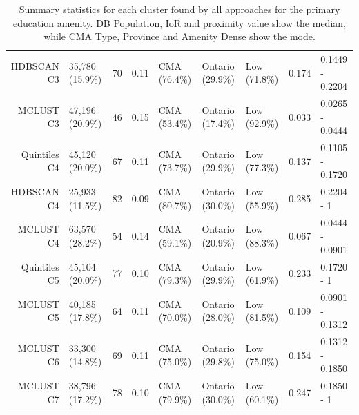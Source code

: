 \documentclass[11pt, a4paper]{article}
\begin{document}
\begin{table}[H]
{\begin{tabular}{|r|llllllll|}
  HDBSCAN C3 & 35,780 (15.9\%) & 70 & 0.11 & CMA (76.4\%) & Ontario (29.9\%) & Low (71.8\%) & 0.174 & 0.1449 - 0.2204 \\ 
  MCLUST C3 & 47,196 (20.9\%) & 46 & 0.15 & CMA (53.4\%) & Ontario (17.4\%) & Low (92.9\%) & 0.033 & 0.0265 - 0.0444 \\ 
  Quintiles C4 & 45,120 (20.0\%) & 67 & 0.11 & CMA (73.7\%) & Ontario (29.9\%) & Low (77.3\%) & 0.137 & 0.1105 - 0.1720 \\ 
  HDBSCAN C4 & 25,933 (11.5\%) & 82 & 0.09 & CMA (80.7\%) & Ontario (30.0\%) & Low (55.9\%) & 0.285 & 0.2204 - 1 \\ 
  MCLUST C4 & 63,570 (28.2\%) & 54 & 0.14 & CMA (59.1\%) & Ontario (20.9\%) & Low (88.3\%) & 0.067 & 0.0444 - 0.0901 \\ 
  Quintiles C5 & 45,104 (20.0\%) & 77 & 0.10 & CMA (79.3\%) & Ontario (29.9\%) & Low (61.9\%) & 0.233 & 0.1720 - 1 \\ 
  MCLUST C5 & 40,185 (17.8\%) & 64 & 0.11 & CMA (70.0\%) & Ontario (28.0\%) & Low (81.5\%) & 0.109 & 0.0901 - 0.1312 \\ 
  MCLUST C6 & 33,300 (14.8\%) & 69 & 0.11 & CMA (75.0\%) & Ontario (29.8\%) & Low (75.0\%) & 0.154 & 0.1312 - 0.1850 \\ 
  MCLUST C7 & 38,796 (17.2\%) & 78 & 0.10 & CMA (79.9\%) & Ontario (30.0\%) & Low (60.1\%) & 0.247 & 0.1850 - 1 \\ 
   \hline
\end{tabular}}
\caption[Primary education cluster profiles]{Summary statistics for each cluster found by all approaches for the primary education amenity. DB Population, IoR and proximity value show the median, while CMA Type, Province and Amenity Dense show the mode.}\label{prieducprofile}
\end{table}
\end{document}
